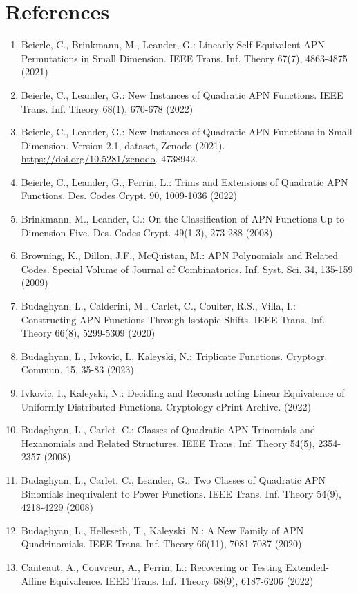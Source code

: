 \documentclass[10pt]{article}
\begin{document}
\section*{References}
\begin{enumerate}
  \item Beierle, C., Brinkmann, M., Leander, G.: Linearly Self-Equivalent APN Permutations in Small Dimension. IEEE Trans. Inf. Theory 67(7), 4863-4875 (2021)
  \item Beierle, C., Leander, G.: New Instances of Quadratic APN Functions. IEEE Trans. Inf. Theory 68(1), 670-678 (2022)
  \item Beierle, C., Leander, G.: New Instances of Quadratic APN Functions in Small Dimension. Version 2.1, dataset, Zenodo (2021). \href{https://doi.org/10.5281/zenodo}{https://doi.org/10.5281/zenodo}. 4738942.
  \item Beierle, C., Leander, G., Perrin, L.: Trims and Extensions of Quadratic APN Functions. Des. Codes Crypt. 90, 1009-1036 (2022)
  \item Brinkmann, M., Leander, G.: On the Classification of APN Functions Up to Dimension Five. Des. Codes Crypt. 49(1-3), 273-288 (2008)
  \item Browning, K., Dillon, J.F., McQuistan, M.: APN Polynomials and Related Codes. Special Volume of Journal of Combinatorics. Inf. Syst. Sci. 34, 135-159 (2009)
  \item Budaghyan, L., Calderini, M., Carlet, C., Coulter, R.S., Villa, I.: Constructing APN Functions Through Isotopic Shifts. IEEE Trans. Inf. Theory 66(8), 5299-5309 (2020)
  \item Budaghyan, L., Ivkovic, I., Kaleyski, N.: Triplicate Functions. Cryptogr. Commun. 15, 35-83 (2023)
  \item Ivkovic, I., Kaleyski, N.: Deciding and Reconstructing Linear Equivalence of Uniformly Distributed Functions. Cryptology ePrint Archive. (2022)
  \item Budaghyan, L., Carlet, C.: Classes of Quadratic APN Trinomials and Hexanomials and Related Structures. IEEE Trans. Inf. Theory 54(5), 2354-2357 (2008)
  \item Budaghyan, L., Carlet, C., Leander, G.: Two Classes of Quadratic APN Binomials Inequivalent to Power Functions. IEEE Trans. Inf. Theory 54(9), 4218-4229 (2008)
  \item Budaghyan, L., Helleseth, T., Kaleyski, N.: A New Family of APN Quadrinomials. IEEE Trans. Inf. Theory 66(11), 7081-7087 (2020)
  \item Canteaut, A., Couvreur, A., Perrin, L.: Recovering or Testing Extended-Affine Equivalence. IEEE Trans. Inf. Theory 68(9), 6187-6206 (2022)

\end{enumerate}
\end{document}
